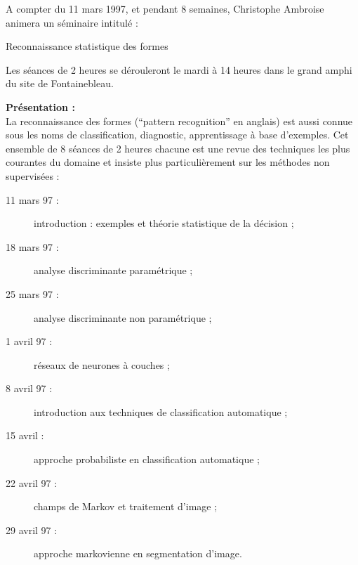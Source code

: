 \setlength{\topmargin}{-2cm}
\setlength{\oddsidemargin}{1cm}
\setlength{\leftmargin}{-5cm}
\setlength{\textwidth}{14.3cm}
\setlength{\textheight}{23.8cm}
\setlength{\parindent}{0cm}
\def\thepage{}



A compter du 11 mars 1997, et pendant 8 semaines, Christophe Ambroise
animera un s\'eminaire intitul\'e : 
\begin{center}
\Large
Reconnaissance statistique des formes
\end{center}
Les s\'eances de 2 heures se d\'erouleront le mardi  \`a 14 heures dans
le grand amphi du site de Fontainebleau.

\vspace{2cm}

{\bf Pr\'esentation :}\\
La reconnaissance des formes (``pattern recognition'' en anglais) est aussi
connue sous les noms de classification, diagnostic, apprentissage \`a 
base d'exemples. Cet ensemble de 8 s\'eances de 2 heures chacune est une revue
des techniques les plus courantes du domaine et insiste plus 
particuli\`erement sur les m\'ethodes non supervis\'ees :

\begin{description}
\item[11 mars 97 :] introduction : exemples et th\'eorie statistique 
 de la d\'ecision ; 
\item[18 mars 97 :] analyse discriminante param\'etrique ;
\item[25 mars 97 :] analyse discriminante non param\'etrique ;
\item[1 avril 97 :] r\'eseaux de neurones \`a couches ;
\item[8 avril 97 :] introduction aux techniques de classification automatique ;
\item[15 avril :] approche probabiliste en classification automatique ;
\item[22 avril 97 :] champs de Markov et traitement d'image ;
\item[29 avril 97 :] approche markovienne en segmentation d'image.
\end{description}

